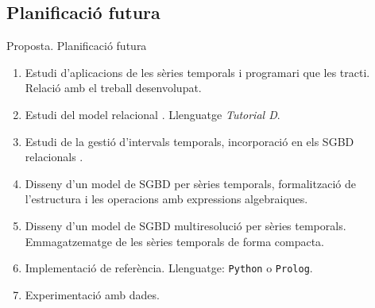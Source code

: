 \subsection{Planificació futura}
\begin{frame}{Proposta. Planificació futura}


  \begin{enumerate}

  \item Estudi d'aplicacions de les sèries temporals i programari que
    les tracti. Relació amb el treball desenvolupat.

  \item Estudi del model relacional \parencite{date:introduction,
      date06,date:dictionary, date:thethirdmanifesto}. Llenguatge
    \emph{Tutorial D}.

  \item Estudi de la gestió d'intervals temporals, incorporació en els
    SGBD relacionals \parencite{date02:_tempor_data_relat_model}.

  \item Disseny d'un model de SGBD per sèries temporals, formalització
    de l'estructura i les operacions amb expressions algebraiques.

  \item Disseny d'un model de SGBD multiresolució per sèries
    temporals. Emmagatzematge de les sèries temporals de forma compacta.

  \item Implementació de referència. Llenguatge: \texttt{Python} o
    \texttt{Prolog}.

  \item Experimentació amb dades.

\end{enumerate}


\end{frame}



